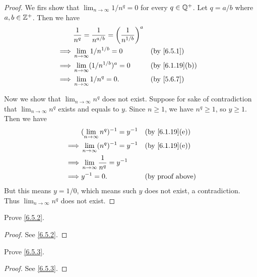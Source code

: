 \begin{proof}
  We firs show that \(\lim_{n \to \infty} 1 / n^q = 0\) for every \(q \in \mathbb{Q}^+\).
  Let \(q = a / b\) where \(a, b \in \mathbb{Z}^+\).
  Then we have
  \begin{align*}
             & \dfrac{1}{n^q} = \dfrac{1}{n^{a / b}} = \bigg(\dfrac{1}{n^{1 / b}}\bigg)^a                                   \\
    \implies & \lim_{n \to \infty} 1 / n^{1 / b} = 0                                      &  & \by{6.5.1}                   \\
    \implies & \lim_{n \to \infty} (1 / n^{1 / b})^a = 0                                  &  & \text{(by \cref{6.1.19}(b))} \\
    \implies & \lim_{n \to \infty} 1 / n^q = 0.                                           &  & \by{5.6.7}
  \end{align*}

  Now we show that \(\lim_{n \to \infty} n^q\) does not exist.
  Suppose for sake of contradiction that \(\lim_{n \to \infty} n^q\) exists and equals to \(y\).
  Since \(n \geq 1\), we have \(n^q \geq 1\), so \(y \geq 1\).
  Then we have
  \begin{align*}
             & (\lim_{n \to \infty} n^q)^{-1} = y^{-1}     &  & \text{(by \cref{6.1.19}(e))} \\
    \implies & \lim_{n \to \infty} (n^q)^{-1} = y^{-1}     &  & \text{(by \cref{6.1.19}(e))} \\
    \implies & \lim_{n \to \infty} \dfrac{1}{n^q} = y^{-1}                                   \\
    \implies & y^{-1} = 0.                                 &  & \text{(by proof above)}
  \end{align*}
  But this means \(y = 1 / 0\), which means such \(y\) does not exist, a contradiction.
  Thus \(\lim_{n \to \infty} n^q\) does not exist.
\end{proof}

\begin{ex}\label{ex:6.5.2}
  Prove \cref{6.5.2}.
\end{ex}

\begin{proof}
  See \cref{6.5.2}.
\end{proof}

\begin{ex}\label{ex:6.5.3}
  Prove \cref{6.5.3}.
\end{ex}

\begin{proof}
  See \cref{6.5.3}.
\end{proof}
